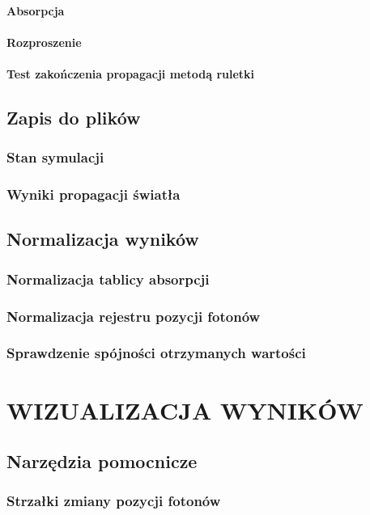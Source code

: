\subsubsection{Absorpcja}
\subsubsection{Rozproszenie}
\subsubsection{Test zakończenia propagacji metodą ruletki}

\section{Zapis do plików}
\subsection{Stan symulacji}
\subsection{Wyniki propagacji światła}
\section{Normalizacja wyników}
\subsection{Normalizacja tablicy absorpcji}
\subsection{Normalizacja rejestru pozycji fotonów}
\subsection{Sprawdzenie spójności otrzymanych wartości}



\chapter{WIZUALIZACJA WYNIKÓW}
\label{chpt:wizualizacja-wyników}
\section{Narzędzia pomocnicze}
\subsection{Strzałki zmiany pozycji fotonów}
